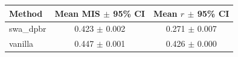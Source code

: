 \begin{tabular}{lcc}\toprule
Method & Mean MIS $\pm$ 95\% CI & Mean $r$ $\pm$ 95\% CI \\\midrule
swa_dpbr & 0.423 $\pm$ 0.002 & 0.271 $\pm$ 0.007 \\
vanilla & 0.447 $\pm$ 0.001 & 0.426 $\pm$ 0.000 \\
\bottomrule
\end{tabular}